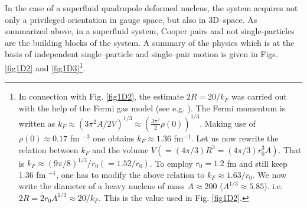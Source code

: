 
In the case of a superfluid quadrupole deformed nucleus, the system acquires not only a privileged orientation in gauge space, but also in 3D--space. As summarized above, in a superfluid system, Cooper pairs and not single-particles are the building blocks of the system. A summary of the physics which is at the basis of independent single--particle and single--pair motion is given in Figs. \ref{fig1D2} and \ref{fig1D3}\footnote{In connection with Fig. \ref{fig1D2}, the estimate $2R=20/k_F$ was carried out with the help of the Fermi gas model (see e.g. \cite{Bohr:69}). The Fermi momentum is written as $k_F\approx (3\pi^2 A/2V)^{1/3}\approx (\frac{3\pi^2}{2}\rho(0))^{1/3}$. Making use of $\rho(0)\approx 0.17$ fm $^{-3}$ one obtains $k_F\approx 1.36 $ fm$^{-1}$. Let us now rewrite the relation between $k_F$ and the volume $V(=(4\pi/3) R^3=(4\pi/3) r_0^3 A)$. That is $k_F\approx (9\pi/8)^{1/3}/r_0(=1.52/r_0)$. To employ $r_0=1.2$ fm and still keep 1.36 fm $^{-1}$, one has to modify the above relation to $k_F\approx 1.63/r_0$. We now write the diameter of a heavy nucleus of mass $A\approx 200$ ($A^{1/3}\approx 5.85$). i.e. $2R=2r_0A^{1/3}\approx 20/k_F$.
	This is the value used in Fig. \ref{fig1D2}.}. 
